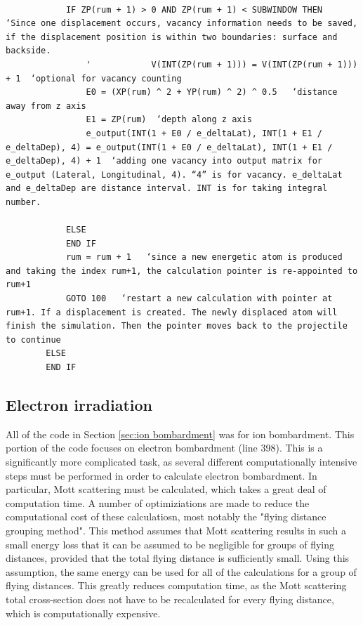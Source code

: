 \documentclass[10pt, reqno]{exam}
\begin{document}
\begin{verbatim}   

            IF ZP(rum + 1) > 0 AND ZP(rum + 1) < SUBWINDOW THEN  ‘Since one displacement occurs, vacancy information needs to be saved, if the displacement position is within two boundaries: surface and backside.
                '            V(INT(ZP(rum + 1))) = V(INT(ZP(rum + 1))) + 1  ‘optional for vacancy counting 
                E0 = (XP(rum) ^ 2 + YP(rum) ^ 2) ^ 0.5   ‘distance away from z axis
                E1 = ZP(rum)  ‘depth along z axis
                e_output(INT(1 + E0 / e_deltaLat), INT(1 + E1 / e_deltaDep), 4) = e_output(INT(1 + E0 / e_deltaLat), INT(1 + E1 / e_deltaDep), 4) + 1  ‘adding one vacancy into output matrix for e_output (Lateral, Longitudinal, 4). “4” is for vacancy. e_deltaLat and e_deltaDep are distance interval. INT is for taking integral number. 
    
            ELSE
            END IF
            rum = rum + 1   ‘since a new energetic atom is produced and taking the index rum+1, the calculation pointer is re-appointed to rum+1
            GOTO 100   ‘restart a new calculation with pointer at rum+1. If a displacement is created. The newly displaced atom will finish the simulation. Then the pointer moves back to the projectile to continue
        ELSE
        END IF
\end{verbatim}

\subsection{Electron irradiation}

All of the code in Section \ref{sec:ion bombardment} was for ion bombardment. This portion of the code focuses on electron bombardment (line 398). This is a significantly more complicated task, as several different computationally intensive steps must be performed in order to calculate electron bombardment. In particular, Mott scattering must be calculated, which takes a great deal of computation time. A number of optimiziations are made to reduce the computational cost of these calculatiosn, most notably the "flying distance grouping method". This method assumes that Mott scattering results in such a small energy loss that it can be assumed to be negligible for groups of flying distances, provided that the total flying distance is sufficiently small. Using this assumption, the same energy can be used for all of the calculations for a group of flying distances. This greatly reduces computation time, as the Mott scattering total cross-section does not have to be recalculated for every flying distance, which is computationally expensive. \par 
\end{document}
